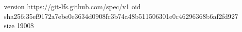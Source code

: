 version https://git-lfs.github.com/spec/v1
oid sha256:35ef9172a7ebe0e3634d0908fc3b74a48b511506301e0c46296368b6af2fd927
size 19008
